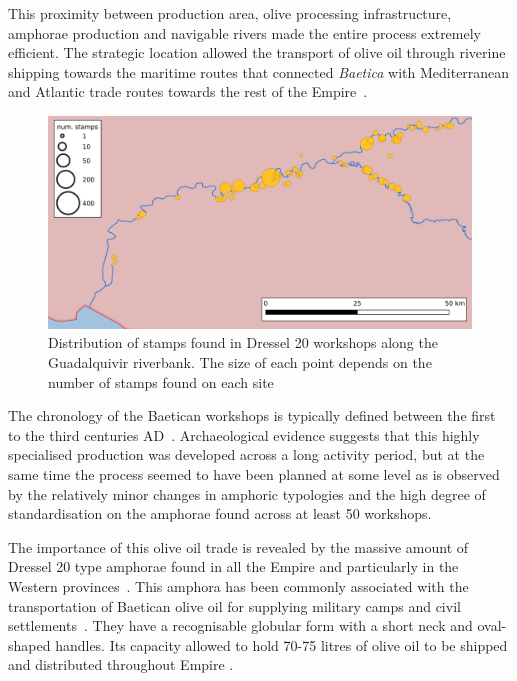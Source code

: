This proximity between production area, olive processing infrastructure, amphorae production and navigable rivers made the entire process extremely efficient. The strategic location allowed the transport of olive oil through riverine shipping towards the maritime routes that connected \textit{Baetica} with Mediterranean and Atlantic trade routes towards the rest of the Empire~\citep{garcia_vargas_enrique_formal_2010}.

\begin{figure}[htp]
	\centering
\includegraphics[width=\linewidth]{baetica}
\caption{Distribution of stamps found in Dressel 20 workshops along the Guadalquivir riverbank. The size of each point depends on the number of stamps found on each site}

\label{workshop}
\end{figure} 

The chronology of the Baetican workshops is typically defined between the first to the third centuries AD~\citep{millet_anforas_1998,rodriguez_baetican_1998,chic2005comercio}. Archaeological evidence suggests that this highly specialised production was developed across a long activity period\citep{remesal_anforas_2004}, but at the same time the process seemed to have been planned at some level as is observed by the relatively minor changes in amphoric typologies and the high degree of standardisation on the amphorae found across at least 50 workshops.

The importance of this olive oil trade is revealed by the massive amount of Dressel 20 type amphorae found in all the Empire and particularly in the Western provinces~\citep{dressel_ricerche_1878,millet_anforas_1998}. This amphora has been commonly associated with the transportation of Baetican olive oil for supplying military camps and civil settlements~\citep{berni_millet_epigrafianforica_2008}. They have a recognisable globular form with a short neck and oval-shaped handles. Its capacity allowed to hold 70-75 litres of olive oil to be shipped and distributed throughout Empire \citep{berni_dressel_2016}.

